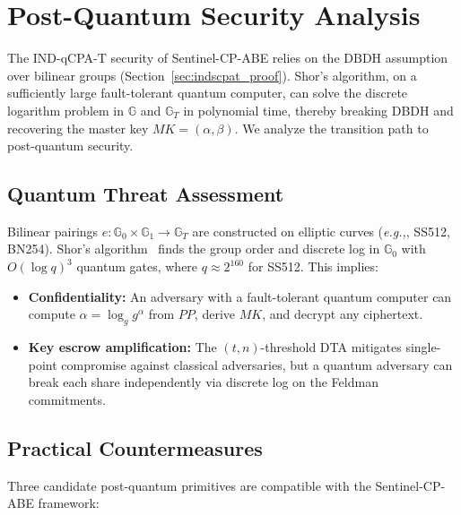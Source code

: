 \documentclass[lettersize,journal]{IEEEtran}
\newcommand{\eg}{\textit{e.g.,}}
\begin{document}
\section{Post-Quantum Security Analysis}
\label{sec:pq_analysis}

The IND-qCPA-T security of Sentinel-CP-ABE relies on the DBDH assumption
over bilinear groups (Section~\ref{sec:indscpat_proof}). Shor's algorithm,
on a sufficiently large fault-tolerant quantum computer, can solve the
discrete logarithm problem in $\mathbb{G}$ and $\mathbb{G}_T$ in
polynomial time, thereby breaking DBDH and recovering the master key
$MK = (\alpha, \beta)$. We analyze the transition path to post-quantum
security.

\subsection{Quantum Threat Assessment}

Bilinear pairings $e: \mathbb{G}_0 \times \mathbb{G}_1 \to \mathbb{G}_T$
are constructed on elliptic curves (\eg, SS512, BN254). Shor's
algorithm~\cite{Shor1997} finds the group order and discrete log in
$\mathbb{G}_0$ with $O(\log q)^3$ quantum gates, where $q \approx 2^{160}$
for SS512. This implies:
\begin{itemize}
    \item \textbf{Confidentiality:} An adversary with a fault-tolerant
    quantum computer can compute $\alpha = \log_g g^\alpha$ from $PP$,
    derive $MK$, and decrypt any ciphertext.
    \item \textbf{Key escrow amplification:} The $(t,n)$-threshold
    DTA mitigates single-point compromise against classical adversaries,
    but a quantum adversary can break each share independently via
    discrete log on the Feldman commitments.
\end{itemize}

\subsection{Practical Countermeasures}

Three candidate post-quantum primitives are compatible with the
Sentinel-CP-ABE framework:
\end{document}
